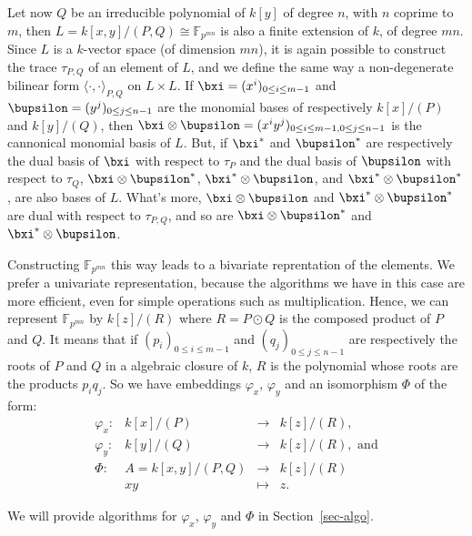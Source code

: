 \documentclass[a4paper,11pt]{article}
\theoremstyle{break}
\theoremstyle{definition}
\theoremstyle{remark}
\newcommand{\ps}[2]{\langle#1,#2\rangle}
\newcommand{\psdot}{\ps{\cdot}{\cdot}}
\begin{document}
Let now $Q$ be an irreducible polynomial of $k[y]$ of degree $n$, with $n$
coprime to $m$, then $L=k[x,y]/(P,Q)\cong \mathbb{F}_{p^{mn}}$ is also a finite 
extension of $k$, of
degree $mn$. Since $L$ is a $k$-vector space (of dimension $mn$), it is again
possible to construct the trace $\tau_{P,Q}$ of an element of $L$, and we define 
the same way
a non-degenerate bilinear form $\psdot_{P,Q}$ on $L\times L$. If
$\bxi=(x^i)_{0\leq i\leq m-1}$ and $\bupsilon=(y^j)_{0\leq j \leq n-1}$ are the
monomial bases of respectively $k[x]/(P)$ and $k[y]/(Q)$, then
$\bxi\otimes\bupsilon=(x^iy^j)_{0\leq i \leq m-1,0\leq j \leq n-1}$ is the
cannonical monomial basis of $L$. But, if $\bxi^*$ and $\bupsilon^*$ are
respectively the dual basis of $\bxi$ with respect to $\tau_P$ and the dual
basis of $\bupsilon$ with respect to $\tau_Q$, $\bxi\otimes\bupsilon^*$, 
$\bxi^*\otimes\bupsilon$, and $\bxi^*\otimes\bupsilon^*$, are also bases of $L$.
What's more, $\bxi\otimes\bupsilon$ and  $\bxi^*\otimes\bupsilon^*$ are dual
with respect to $\tau_{P,Q}$, and so are $\bxi\otimes\bupsilon^*$ and
$\bxi^*\otimes\bupsilon$.

Constructing
$\mathbb{F}_{p^{mn}}$ this way leads to a bivariate reprentation of the
elements. We prefer a univariate representation, because the algorithms we have
in this case are more efficient, even for simple operations such as 
multiplication. Hence, we can represent $\mathbb{F}_{p^{mn}}$ by $k[z]/(R)$
where $R=P\odot Q$ is the composed product of $P$ and $Q$. It means that if
$(p_i)_{0\leq i \leq m-1}$ and $(q_j)_{0\leq j\leq n-1}$ are respectively the
roots of $P$ and $Q$ in a algebraic closure of $k$, $R$ is the polynomial whose
roots are the products $p_iq_j$. So we have embeddings $\varphi_x$, $\varphi_y$
and an isomorphism $\Phi$ of the form:
\[
\begin{array}{crcl}
  \varphi_x: & k[x]/(P) & \to & k[z]/(R),\\[2mm]
  \varphi_y: & k[y]/(Q) & \to & k[z]/(R),\text{ and}\\[2mm]
  \Phi:&  A=k[x,y]/(P,Q) & \to & k[z]/(R) \\
  &  xy & \mapsto & z.
\end{array}
\]

We will provide algorithms for $\varphi_x$, $\varphi_y$ and $\Phi$ in Section~\ref{sec-algo}.
\end{document}
